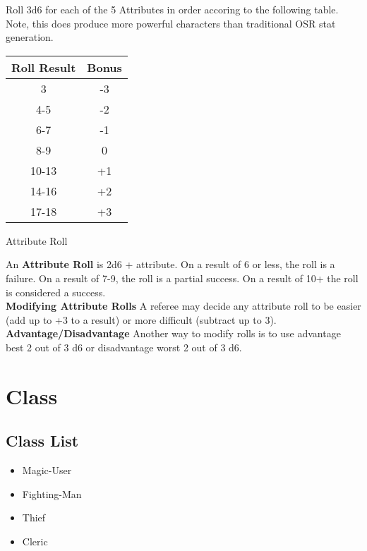\documentclass[18pt]{article}
\begin{document}
\begin{multicols}{2}
Roll 3d6 for each of the 5 Attributes in order accoring to the following table. Note, this does produce more powerful characters than traditional OSR stat generation.


\begin{table}[H]

\begin{center}
\Large
{}
\begin{tabular}{ c  c  }


\textbf{
Roll Result} &\textbf{ Bonus}\\
\bottomrule
\bottomrule

3 & -3 \\

4-5 & -2 \\

6-7 & -1 \\

8-9 & 0 \\

10-13 & +1 \\

14-16 & +2 \\

17-18 & +3 \\

\end{tabular}
\end{center}
\label{table:RollingAttributes}
\vspace{-1cm}
\end{table}

\begin{mercHeading} %
Attribute Roll
\end{mercHeading}

An \textbf{Attribute Roll} is 2d6 + attribute. On a result of 6 or less, the roll is a failure. On a result of 7-9, the roll is a partial success. On a result of 10+ the roll is considered a success.\\
\textbf{Modifying Attribute Rolls} A referee may decide any attribute roll to be easier (add up to +3 to a result) or more difficult (subtract up to 3). \\
\textbf{Advantage/Disadvantage} Another way to modify rolls is to use advantage best 2 out of 3 d6 or disadvantage worst 2 out of 3 d6.


\section*{Class}
\subsection*{Class List}
\label{label:Class}
\begin{itemize}
	\item Magic-User
	\item Fighting-Man
	\item Thief
	\item Cleric
\end{itemize}

\end{multicols}
\end{document}
